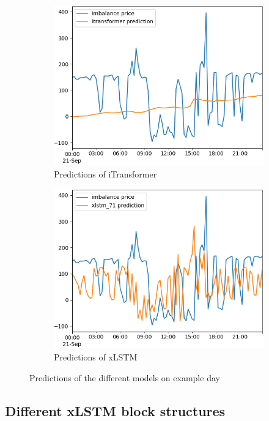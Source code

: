 \documentclass[class=scrbook, crop=false]{standalone}
\begin{document}
\begin{figure}
\begin{subfigure}{0.45\textwidth}
  \includegraphics[width=\linewidth]{../images/results/itransformer_prediction.png}
  \caption{Predictions of iTransformer}
  \label{fig:sfig1}
\end{subfigure}
\begin{subfigure}{0.45\textwidth}
  \includegraphics[width=\linewidth]{../images/results/xlstm_prediction.png}
  \caption{Predictions of xLSTM}
  \label{fig:sfig1}
\end{subfigure}
\caption{Predictions of the different models on example day}
\label{fig:fig}
\end{figure}

\subsection{Different xLSTM block structures}
\end{document}

